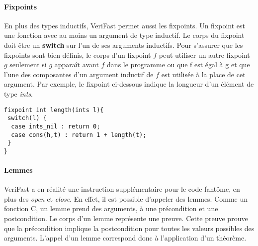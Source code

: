 \documentclass[11pt,openany]{article}
\newcommand{\verifast}{VeriFast}
\begin{document}
			\paragraph{Fixpoints}
				En plus des types inductifs, \verifast{} permet aussi les fixpoints. Un fixpoint est une fonction avec au moins un argument de type inductif. Le corps du fixpoint doit \^etre un \textbf{switch} sur l'un de ses arguments inductifs. Pour s'assurer que les fixpoints sont bien d\'efinis, le corps d'un fixpoint $f$ peut utiliser un autre fixpoint $g$ seulement si $g$ appara\^it avant $f$ dans le programme ou que f est \'egal \`a g et que l'une des composantes d'un argument inductif de $f$ est utilis\'ee \`a la place de cet argument. Par exemple, le fixpoint ci-dessous indique la longueur d'un \'el\'ement de type \textit{ints}.
			\begin{lstlisting}
fixpoint int length(ints l){
 switch(l) {
  case ints_nil : return 0;
  case cons(h,t) : return 1 + length(t);
 }
}
			\end{lstlisting}
			\paragraph{Lemmes}
			\verifast{} a en r\'ealit\'e une instruction suppl\'ementaire pour le code fant\^ome, en plus des \textit{open} et \textit{close}. En effet, il est possible d'appeler des lemmes. Comme un fonction C, un lemme prend des arguments, \`a une pr\'econdition et une postcondition. Le corps d'un lemme repr\'esente une preuve. Cette preuve prouve que la pr\'econdition implique la postcondition pour toutes les valeurs possibles des arguments. L'appel d'un lemme correspond donc \`a l'application d'un th\'eor\`eme.
			
\end{document}
